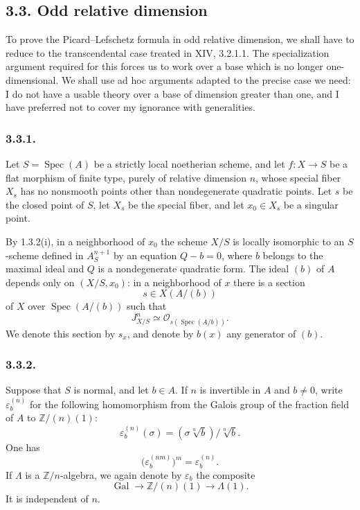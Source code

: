 \subsection*{3.3. Odd relative dimension}

To prove the Picard--Lefschetz formula in odd relative dimension, we
shall have to reduce to the transcendental case treated in XIV,
3.2.1.1.  The specialization argument required for this forces us to
work over a base which is no longer one-dimensional.  We shall use
ad hoc arguments adapted to the precise case we need: I do not have
a usable theory over a base of dimension greater than one, and I have
preferred not to cover my ignorance with generalities.

\subsubsection*{3.3.1.}
Let $S=\operatorname{Spec}(A)$ be a strictly local noetherian scheme,
and let $f:X\to S$ be a flat morphism of finite type, purely of
relative dimension $n$, whose special fiber $X_s$ has no nonsmooth
points other than nondegenerate quadratic points.  Let $s$ be the
closed point of $S$, let $X_s$ be the special fiber, and let
$x_0\in X_s$ be a singular point.

By 1.3.2(i), in a neighborhood of $x_0$ the scheme $X/S$ is locally
isomorphic to an $S$-scheme defined in $A^{n+1}_S$ by an
equation $Q-b=0$, where $b$ belongs to the maximal ideal and $Q$ is a
nondegenerate quadratic form.  The ideal $(b)$ of $A$ depends only
on $(X/S,x_0)$: in a neighborhood of $x$ there is a section
\[
s\in X(A/(b))
\]
of $X$ over $\operatorname{Spec}(A/(b))$ such that
\[
J^n_{X/S}\simeq
\mathcal O_{s(\operatorname{Spec}(A/b))}.
\]
We denote this section by $s_x$, and denote by $b(x)$ any generator
of $(b)$.

\subsubsection*{3.3.2.}
Suppose that $S$ is normal, and let $b\in A$.  If $n$ is invertible
in $A$ and $b\ne0$, write $\varepsilon_b^{(n)}$ for the following
homomorphism from the Galois group of the fraction field of $A$ to
$\mathbb Z/(n)(1)$:
\[
\varepsilon_b^{(n)}(\sigma)
= (\sigma\sqrt[n]{b})/\sqrt[n]{b}.
\]
One has
\[
\bigl(\varepsilon_b^{(nm)}\bigr)^m=\varepsilon_b^{(n)}.
\]
If $\Lambda$ is a $\mathbb Z/n$-algebra, we again denote by
$\varepsilon_b$ the composite
\[
\operatorname{Gal}\longrightarrow\mathbb Z/(n)(1)
\longrightarrow\Lambda(1).
\]
It is independent of $n$.

